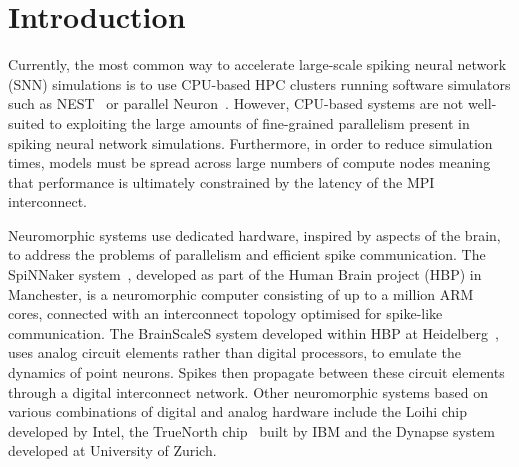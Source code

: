 \documentclass[utf8]{frontiersSCNS} %
\begin{document}
\section{Introduction}

Currently, the most common way to accelerate large-scale spiking neural network (SNN) simulations is to use CPU-based HPC clusters running software simulators such as NEST~\citep{Gewaltig2007} or parallel Neuron~\citep{carnevale2006neuron}.
However, CPU-based systems are not well-suited to exploiting the large amounts of fine-grained parallelism present in spiking neural network simulations.
Furthermore, in order to reduce simulation times, models must be spread across large numbers of compute nodes meaning that performance is ultimately constrained by the latency of the MPI interconnect.

Neuromorphic systems use dedicated hardware, inspired by aspects of the brain, to address the problems of parallelism and efficient spike communication.
The SpiNNaker system~\citep{Furber2014}, developed as part of the Human Brain project (HBP) in Manchester, is a neuromorphic computer consisting of up to a million ARM cores, connected with an interconnect topology optimised for spike-like communication.
The BrainScaleS system developed within HBP at Heidelberg~\citep{Schemmel2017}, uses analog circuit elements rather than digital processors, to emulate the dynamics of point neurons.
Spikes then propagate between these circuit elements through a digital interconnect network.
Other neuromorphic systems based on various combinations of digital and analog hardware include the Loihi chip~\citep{Davies2018} developed by Intel, the TrueNorth chip~\citep{Merolla2014} built by IBM and the Dynapse system~\cite{Qiao2015} developed at University of Zurich.
\end{document}
